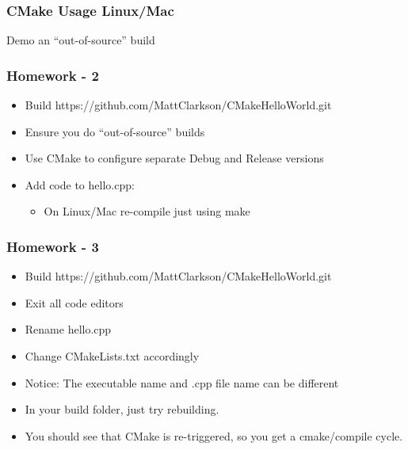 \subsubsection{CMake Usage Linux/Mac}\label{cmake-usage-linuxmac}

Demo an ``out-of-source'' build

\begin{Shaded}
\begin{Highlighting}[]
 
 
 
 
 
\end{Highlighting}
\end{Shaded}

\subsubsection{Homework - 2}\label{homework---2}

\begin{itemize}
\itemsep1pt\parskip0pt
\item
  Build https://github.com/MattClarkson/CMakeHelloWorld.git
\item
  Ensure you do ``out-of-source'' builds
\item
  Use CMake to configure separate Debug and Release versions
\item
  Add code to hello.cpp:

  \begin{itemize}
  \itemsep1pt\parskip0pt
  \item
    On Linux/Mac re-compile just using make
  \end{itemize}
\end{itemize}

\subsubsection{Homework - 3}\label{homework---3}

\begin{itemize}
\itemsep1pt\parskip0pt
\item
  Build https://github.com/MattClarkson/CMakeHelloWorld.git
\item
  Exit all code editors
\item
  Rename hello.cpp
\item
  Change CMakeLists.txt accordingly
\item
  Notice: The executable name and .cpp file name can be different
\item
  In your build folder, just try rebuilding.
\item
  You should see that CMake is re-triggered, so you get a cmake/compile
  cycle.
\end{itemize}

